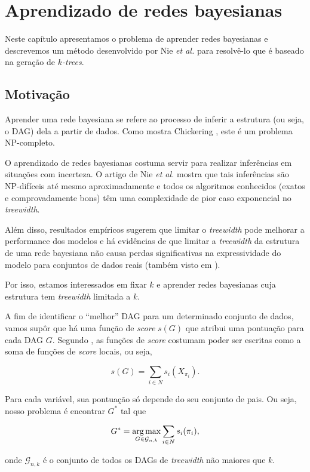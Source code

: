 \chapter{Aprendizado de redes bayesianas}
\label{cap:aprendizado}

Neste capítulo apresentamos o problema de aprender redes bayesianas e descrevemos um método desenvolvido por Nie \emph{et al.} \cite{nie} para resolvê-lo que é baseado na geração de \emph{$k$-trees}.

\section{Motivação}

Aprender uma rede bayesiana se refere ao processo de inferir a estrutura (ou seja, o DAG) dela a partir de dados. Como mostra Chickering \cite{chickering}, este é um problema NP-completo.

O aprendizado de redes bayesianas costuma servir para realizar inferências em situações com incerteza. O artigo de Nie \emph{et al.} \cite{maua} mostra que tais inferências são NP-difíceis até mesmo aproximadamente e todos os algoritmos conhecidos (exatos e comprovadamente bons) têm uma complexidade de pior caso exponencial no \emph{treewidth}.

Além disso, resultados empíricos sugerem que limitar o \emph{treewidth} pode melhorar a performance dos modelos e há evidências de que limitar a \emph{treewidth} da estrutura de uma rede bayesiana não causa perdas significativas na expressividade do modelo para conjuntos de dados reais (também visto em \cite{maua}).

Por isso, estamos interessados em fixar $k$ e aprender redes bayesianas cuja estrutura tem \emph{treewidth} limitada a $k$.

A fim de identificar o ``melhor'' DAG para um determinado conjunto de dados, vamos supôr que há uma função de \emph{score} $s(G)$ que atribui uma pontuação para cada DAG $G$. Segundo \cite{nie}, as funções de \emph{score} costumam poder ser escritas como a soma de funções de \emph{score} locais, ou seja,

$$s(G) = \sum_{i \in N} s_i(X_{\pi_i}).$$

Para cada variável, sua pontuação só depende do seu conjunto de pais. Ou seja, nosso problema é encontrar $G^*$ tal que

$$G^* = \operatorname*{arg\,max}_{G \in \mathcal{G}_{n,k}} \sum_{i \in N} s_i(\pi_i),$$

onde $\mathcal{G}_{n,k}$ é o conjunto de todos os DAGs de \emph{treewidth} não maiores que $k$.

